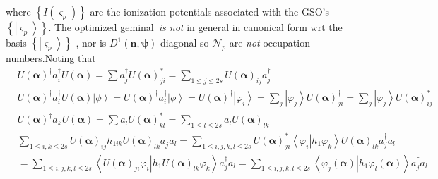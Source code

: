 \documentclass[aps,preprint]{revtex4}%
\begin{document}
where $\left\{  I\left(  \varsigma_{p}\right)  \right\}  $ are the ionization
potentials associated with the GSO's $\left\{  \left\vert \varsigma
_{p}\right\rangle \right\}  .$ The optimized geminal\ \emph{is not} in general
in canonical form wrt the basis $\left\{  \left\vert \varsigma_{p}%
\right\rangle \right\}  $ , nor is $D^{1}\left(  \mathbf{n},\mathbf{\psi
}\right)  $ diagonal so $\mathcal{N}_{p}$ are \emph{not} occupation
numbers.Noting that
\begin{align}
&  U\left(  \mathbf{\alpha}\right)  ^{\dagger}a_{i}^{\dagger}U\left(
\mathbf{\alpha}\right)  =\sum a_{j}^{\dagger}U\left(  \mathbf{\alpha}\right)
_{ji}^{\ast}=\sum_{1\leq j\leq2s}U\left(  \mathbf{\alpha}\right)  _{ij}%
a_{j}^{\dagger}\\
&  U\left(  \mathbf{\alpha}\right)  ^{\dagger}a_{i}^{\dagger}U\left(
\mathbf{\alpha}\right)  \left\vert \phi\right\rangle =U\left(  \mathbf{\alpha
}\right)  ^{\dagger}a_{i}^{\dagger}\left\vert \phi\right\rangle =U\left(
\mathbf{\alpha}\right)  ^{\dagger}\left\vert \varphi_{i}\right\rangle
=\sum_{j}\left\vert \varphi_{j}\right\rangle U\left(  \mathbf{\alpha}\right)
_{ji}^{\dagger}=\sum_{j}\left\vert \varphi_{j}\right\rangle U\left(
\mathbf{\alpha}\right)  _{ij}^{\ast}\\
&  U\left(  \mathbf{\alpha}\right)  ^{\dagger}a_{k}U\left(  \mathbf{\alpha
}\right)  =\sum a_{l}U\left(  \mathbf{\alpha}\right)  _{kl}^{\ast}=\sum_{1\leq
l\leq2s}a_{l}U\left(  \mathbf{\alpha}\right)  _{lk}\\
&  \sum_{1\leq i,k\leq2s}U\left(  \mathbf{\alpha}\right)  _{ij}h_{1ik}U\left(
\mathbf{\alpha}\right)  _{lk}a_{j}^{\dagger}a_{l}=\sum_{1\leq i,j,k,l\leq
2s}U\left(  \mathbf{\alpha}\right)  _{ji}^{\ast}\left\langle \left.
\varphi_{i}\right\vert h_{1}\varphi_{k}\right\rangle U\left(  \mathbf{\alpha
}\right)  _{lk}a_{j}^{\dagger}a_{l}\\
&  =\sum_{1\leq i,j,k,l\leq2s}\left\langle \left.  U\left(  \mathbf{\alpha
}\right)  _{ji}\varphi_{i}\right\vert h_{1}U\left(  \mathbf{\alpha}\right)
_{lk}\varphi_{k}\right\rangle a_{j}^{\dagger}a_{l}=\sum_{1\leq i,j,k,l\leq
2s}\left\langle \left.  \varphi_{j}\left(  \mathbf{\alpha}\right)  \right\vert
h_{1}\varphi_{l}\left(  \mathbf{\alpha}\right)  \right\rangle a_{j}^{\dagger
}a_{l}%
\end{align}
%
\end{document}
